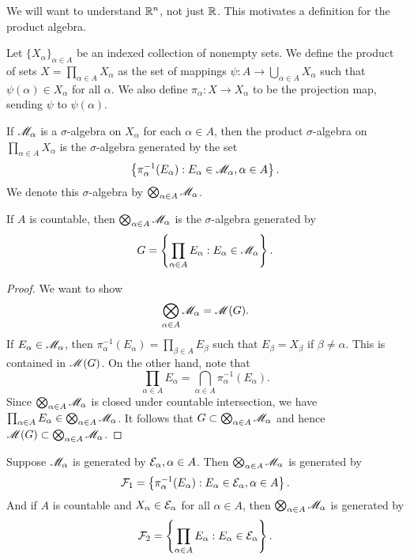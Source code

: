 \documentclass[12pt]{article} %
\begin{document}
We will want to understand $\mathbb{R}^n$, not just $\mathbb{R}$. This motivates a definition for the product algebra.

\begin{definition}
    Let $\{X_\alpha\}_{\alpha \in A}$ be an indexed collection of nonempty sets. We define the product of sets $X = \prod_{\alpha \in A} X_\alpha$ as the set of mappings $\psi : A \to \bigcup_{\alpha \in A} X_\alpha$ such that $\psi(\alpha) \in X_\alpha$ for all $\alpha$. We also define $\pi_\alpha : X \to X_\alpha$ to be the projection map, sending $\psi$ to $\psi(\alpha)$.

    If $\mathscr{M}_\alpha$ is a $\sigma$-algebra on $X_\alpha$ for each $\alpha \in A$, then the product $\sigma$-algebra on $\prod_{\alpha \in A} X_\alpha$ is the $\sigma$-algebra generated by the set \[\left\{ \pi_{\alpha}^{-1}(E_\alpha) : E_\alpha \in \mathscr{M}_\alpha, \alpha \in A\right\}.\] We denote this $\sigma$-algebra by $\bigotimes_{\alpha \in A} \mathscr{M}_\alpha$.
\end{definition}

\begin{proposition}
    If $A$ is countable, then $\bigotimes_{\alpha \in A} \mathscr{M}_\alpha$ is the $\sigma$-algebra generated by \[G = \left\{ \prod_{\alpha \in A} E_\alpha : E_\alpha \in \mathscr{M}_\alpha\right\}.\]
\end{proposition}

\begin{proof}
    We want to show \[\bigotimes_{\alpha \in A} \mathscr{M}_\alpha = \mathscr{M}(G).\]
    If $E_\alpha \in \mathscr{M}_\alpha$, then $\pi_{\alpha}^{-1}(E_\alpha) = \prod_{\beta \in A} E_\beta$ such that $E_\beta = X_\beta$ if $\beta \neq \alpha$. This is contained in $\mathscr{M}(G)$. On the other hand, note that \[\prod_{\alpha \in A}E_\alpha = \bigcap_{\alpha \in A} \pi_{\alpha}^{-1}(E_\alpha).\] Since $\bigotimes_{\alpha \in A} \mathscr{M}_\alpha$ is closed under countable intersection, we have $\prod_{\alpha \in A}E_\alpha \in \bigotimes_{\alpha \in A} \mathscr{M}_\alpha$. It follows that $G \subset \bigotimes_{\alpha \in A} \mathscr{M}_\alpha$ and hence $\mathscr{M}(G) \subset \bigotimes_{\alpha \in A} \mathscr{M}_\alpha$.
\end{proof}

\begin{proposition}\label{prop:countable-sigma-algebra-generator}
    Suppose $\mathscr{M}_\alpha$ is generated by $\mathcal{E}_\alpha, \alpha \in A$. Then $\bigotimes_{\alpha \in A} \mathscr{M}_\alpha$ is generated by \[\mathcal{F}_1 = \left\{ \pi_{\alpha}^{-1}(E_\alpha) : E_\alpha \in \mathcal{E}_\alpha, \alpha \in A \right\}.\] And if $A$ is countable and $X_\alpha \in \mathcal{E}_\alpha$ for all $\alpha \in A$, then $\bigotimes_{\alpha \in A} \mathscr{M}_\alpha$ is generated by \[\mathcal{F}_2 = \left\{ \prod_{\alpha \in A} E_\alpha : E_\alpha \in \mathcal{E}_\alpha \right\}.\]
\end{proposition}
\end{document}
